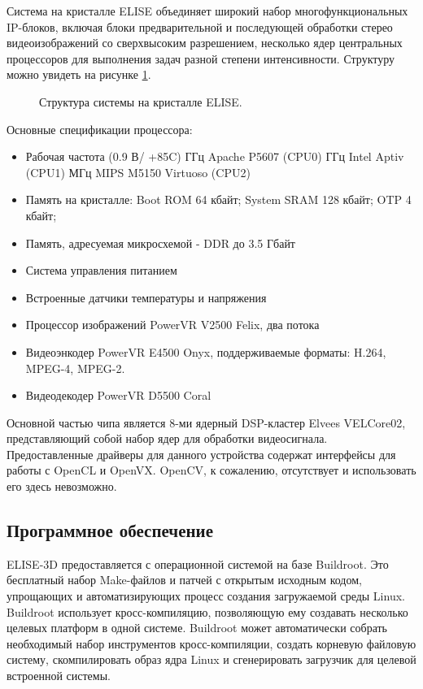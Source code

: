 \documentclass[12pt,a4paper]{scrartcl}
\begin{document}
			Система на кристалле ELISE объединяет широкий набор многофункциональных IP-блоков, включая блоки предварительной и последующей обработки стерео видеоизображений со сверхвысоким разрешением, несколько ядер центральных процессоров для выполнения задач разной степени интенсивности. Структуру можно увидеть на рисунке \ref{fig:Elise_Scheme}\cite{bib:Elise_CPU_Desc}.
			
			\begin{figure}[h]
				\caption{Структура системы на кристалле ELISE.}
				\label{fig:Elise_Scheme}
			\end{figure}
			
			Основные спецификации процессора:
			
			\begin{itemize}
				\item Рабочая частота (0.9 В/ +85\textdegree{}C)
					 ГГц Apache P5607 (CPU0)
					 ГГц Intel Aptiv (CPU1)
					 МГц MIPS M5150 Virtuoso (CPU2)
				\item Память на кристалле: Boot ROM 64 кбайт; System SRAM 128 кбайт; OTP 4 кбайт;
				\item Память, адресуемая микросхемой - DDR до 3.5 Гбайт
				\item Система управления питанием
				\item Встроенные датчики температуры и напряжения
				\item Процессор изображений PowerVR V2500 Felix, два потока
				\item Видеоэнкодер PowerVR E4500 Onyx, поддерживаемые форматы: H.264, MPEG-4, MPEG-2.
				\item Видеодекодер PowerVR D5500 Coral
			\end{itemize}
		
			Основной частью чипа является 8-ми ядерный DSP-кластер Elvees VELCore02, представляющий собой набор ядер для обработки видеосигнала. Предоставленные драйверы для данного устройства содержат интерфейсы для работы с OpenCL и OpenVX. OpenCV, к сожалению, отсутствует и использовать его здесь невозможно.
		
	\subsection{Программное обеспечение}
	
		ELISE-3D предоставляется с операционной системой на базе Buildroot. Это бесплатный набор Make-файлов и патчей с открытым исходным кодом, упрощающих и автоматизирующих процесс создания загружаемой среды Linux. Buildroot использует кросс-компиляцию, позволяющую ему создавать несколько целевых платформ в одной системе. Buildroot может автоматически собрать необходимый набор инструментов кросс-компиляции, создать корневую файловую систему, скомпилировать образ ядра Linux и сгенерировать загрузчик для целевой встроенной системы.
		
\end{document}

